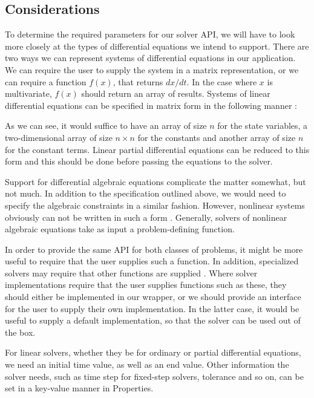 \documentclass[\rootfolder/main.tex]{subfiles}
\begin{document}
\subsection{Considerations}

To determine the required parameters for our solver API, we will have to look more closely at the types of differential equations we intend to support.
There are two ways we can represent systems of differential equations in our application.
We can require the user to supply the system in a matrix representation, or we can require a function $f(x)$, that returns $dx/dt$.
In the case where $x$ is multivariate, $f(x)$ should return an array of results.
Systems of linear differential equations can be specified in matrix form in the following manner \cite{kreyzig}:


As we can see, it would suffice to have an array of size $n$ for the state variables,
a two-dimensional array of size $n \times n$ for the constants and another array of size $n$ for the constant terms.
Linear partial differential equations can be reduced to this form and this should be done before passing the equations to the solver.

Support for differential algebraic equations complicate the matter somewhat, but not much.
In addition to the specification outlined above, we would need to specify the algebraic constraints in a similar fashion.
However, nonlinear systems obviously can not be written in such a form \cite{khalil}.
Generally, solvers of nonlinear algebraic equations take as input a problem-defining function.

In order to provide the same API for both classes of problems, it might be more useful to require that the user supplies such a function.
In addition, specialized solvers may require that other functions are supplied \cite{kinsol}\cite{cvode}\cite{ida}.
Where solver implementations require that the user supplies functions such as these, they should either be implemented in our wrapper,
or we should provide an interface for the user to supply their own implementation.
In the latter case, it would be useful to supply a default implementation, so that the solver can be used out of the box.

For linear solvers, whether they be for ordinary or partial differential equations, we need an initial time value, as well as an end value.
Other information the solver needs, such as time step for fixed-step solvers, tolerance and so on, can be set in a key-value manner in Properties.
\end{document}
